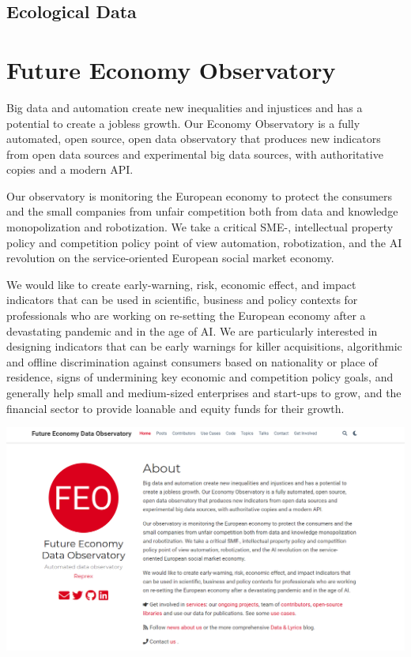 \documentclass[
  a4paper,
  openany, a4paper, oneside]{book}
\begin{document}
\hypertarget{ecological-data}{%
\section{Ecological Data}\label{ecological-data}}

\hypertarget{future-economy}{%
\chapter{Future Economy Observatory}\label{future-economy}}

Big data and automation create new inequalities and injustices and has a potential to create a jobless growth. Our Economy Observatory is a fully automated, open source, open data observatory that produces new indicators from open data sources and experimental big data sources, with authoritative copies and a modern API.

Our observatory is monitoring the European economy to protect the consumers and the small companies from unfair competition both from data and knowledge monopolization and robotization. We take a critical SME-, intellectual property policy and competition policy point of view automation, robotization, and the AI revolution on the service-oriented European social market economy.

We would like to create early-warning, risk, economic effect, and impact indicators that can be used in scientific, business and policy contexts for professionals who are working on re-setting the European economy after a devastating pandemic and in the age of AI. We are particularly interested in designing indicators that can be early warnings for killer acquisitions, algorithmic and offline discrimination against consumers based on nationality or place of residence, signs of undermining key economic and competition policy goals, and generally help small and medium-sized enterprises and start-ups to grow, and the financial sector to provide loanable and equity funds for their growth.

\begin{center}\includegraphics[width=0.8\linewidth]{plots/screenshots/fmo_screenshot} \end{center}
\end{document}
